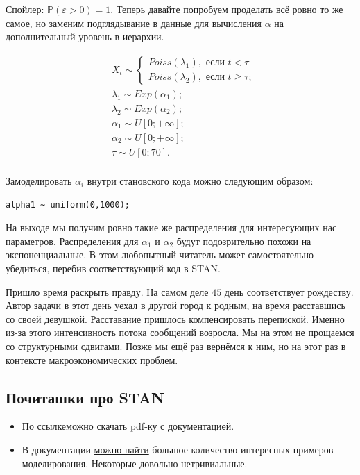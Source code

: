 \documentclass[12pt, a4paper, oneside]{extreport}
\def \mbb{\mathbb}
\def \PP{\mbb{P}}
\theoremstyle{plain}              %
\theoremstyle{definition}         %
\begin{document}
Спойлер: $\PP(\varepsilon > 0) = 1 $. Теперь давайте попробуем проделать всё ровно то же самое, но заменим подглядывание в данные для вычисления $\alpha$ на дополнительный уровень в иерархии. 

\begin{equation*}
\begin{aligned}
& X_t \sim \begin{cases}  Poiss(\lambda_1), \text{ если } t < \tau \\  Poiss(\lambda_2), \text{ если } t \ge \tau; \end{cases}\\
&\lambda_1 \sim Exp(\alpha_1); \\
& \lambda_2 \sim Exp(\alpha_2); \\
&\alpha_1 \sim U[0;+\infty]; \\
&\alpha_2 \sim U[0;+\infty]; \\
&\tau \sim U[0;70]. \\ 
\end{aligned}
\end{equation*}


Замоделировать $\alpha_i$ внутри становского кода можно следующим образом: 

\begin{verbatim}
alpha1 ~ uniform(0,1000);
\end{verbatim}

На выходе мы получим ровно такие же распределения для интересующих нас параметров. Распределения для $\alpha_1$ и $\alpha_2$ будут подозрительно похожи на экспоненциальные. В этом любопытный читатель может самостоятельно убедиться, перебив соответствующий код в STAN. 

Пришло время раскрыть правду. На самом деле $45$ день соответствует рождеству. Автор задачи в этот день уехал в другой город к родным, на время расставшись со своей девушкой. Расставание пришлось компенсировать перепиской. Именно из-за этого интенсивность потока сообщений возросла. Мы на этом не прощаемся со структурными сдвигами. Позже мы ещё раз вернёмся к ним, но на этот раз в контексте макроэкономических проблем.  



 \subsection{Почиташки про STAN}
 
 
 \begin{itemize}
 	\item \href{https://github.com/stan-dev/stan/releases/download/v2.16.0/stan-reference-2.16.0.pdf}{По ссылке}можно скачать pdf-ку с документацией. 
 	
 	
 	\item  В документации \href{http://mc-stan.org/users/documentation/case-studies.html}{можно найти} большое количество интересных примеров моделирования. Некоторые довольно нетривиальные. 
 \end{itemize}
\end{document}
